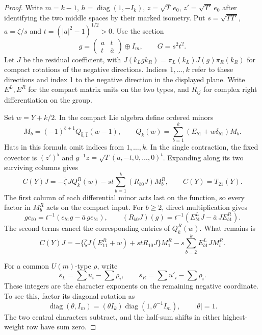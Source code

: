 \begin{proof}
Write \(m=k-1\), \(h=\operatorname{diag}(1,-I_k)\),
\(z=\sqrt{T}\,e_0\), \(z'=\sqrt{T'}\,e_0\) after identifying the
two middle spaces by their marked isometry. Put
\(s=\sqrt{TT'}\), \(a=\zeta/s\) and \(t=(|a|^2-1)^{1/2}>0\). Use the section
\[
 g=\begin{pmatrix}a&t\\t&\bar a\end{pmatrix}\oplus I_m,\qquad
 G=s^2t^2 .
\]
Let \(J\) be the residual coefficient, with
\(J(k_L g k_R)=\pi_L(k_L)J(g)\pi_R(k_R)\) for compact rotations
of the negative directions. Indices \(1,\ldots,k\) refer to these
directions and index 1 to the negative direction in the displayed
plane. Write \(E^L,E^R\) for the compact matrix units on the two
types, and \(R_{ij}\) for complex right differentiation on the group.

Set \(w=Y+k/2\). In the compact Lie algebra define ordered minors
\[
 M_b=(-1)^{b+1}Q_{\widehat b,\widehat1}(w-1),\qquad
 Q_k(w)=\sum_{b=1}^k(E_{b1}+w\delta_{b1})M_b .
\]
Hats in this formula omit indices from \(1,\ldots,k\). In the
single contraction, the fixed covector is \((z')^\flat\) and
\(g^{-1}z=\sqrt T(\bar a,-t,0,\ldots,0)^t\).
Expanding along its two surviving columns gives
\[
 C(Y)J=-\bar\zeta\,JQ_k^R(w)-st\sum_{b=1}^k(R_{b0}J)M_b^R ,
 \qquad C(Y)=T_{21}(Y).
\]
The first column of each differential minor acts last on the
function, so every factor in \(M_b^R\) acts on the compact input.
For \(b\ge2\), direct multiplication gives
\[
 g e_{b0}=t^{-1}(e_{b1}g-\bar a\,g e_{b1}),\qquad
 (R_{b0}J)(g)=t^{-1}(E^L_{b1}J-\bar a\,J E^R_{b1}).
\]
The second terms cancel the corresponding entries of \(Q_k^R(w)\).
What remains is
\begin{equation}\label{eq:single-angular-expansion}
 C(Y)J=-\{\bar\zeta J(E^R_{11}+w)+st R_{10}J\}M_1^R
                   -s\sum_{b=2}^k E^L_{b1}J M_b^R .
\end{equation}

For a common \(U(m)\)-type \(\rho\), write
\[
 s_L=\sum u_i-\sum\rho_i,\qquad s_R=\sum u'_i-\sum\rho_i .
\]
These integers are the character exponents on the remaining negative
coordinate. To see this, factor its diagonal rotation as
\[
 \operatorname{diag}(\theta,I_m)
   =(\theta I_k)\operatorname{diag}(1,\theta^{-1}I_m),
     \qquad |\theta|=1 .
\]
The two central characters subtract, and the half-sum shifts in
either highest-weight row have sum zero.


\end{proof}
